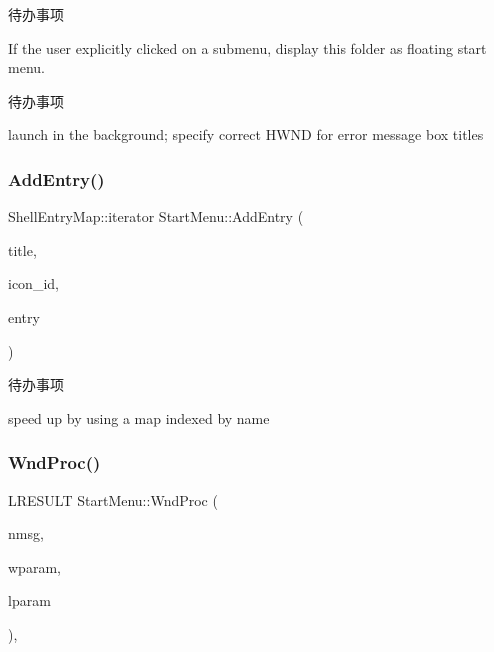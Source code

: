 \begin{DoxyRefDesc}{待办事项}
\item[\hyperlink{todo__todo000064}{待办事项}]If the user explicitly clicked on a submenu, display this folder as floating start menu. \end{DoxyRefDesc}


\begin{DoxyRefDesc}{待办事项}
\item[\hyperlink{todo__todo000065}{待办事项}]launch in the background; specify correct H\+W\+ND for error message box titles \end{DoxyRefDesc}
\mbox{\label{struct_start_menu_a3649f39dcdb77983e7f3e4de8bc9d1bf}} 
\subsubsection{\texorpdfstring{Add\+Entry()}{AddEntry()}}
{\footnotesize\ttfamily Shell\+Entry\+Map\+::iterator Start\+Menu\+::\+Add\+Entry (\begin{DoxyParamCaption}\item[{const String \&}]{title,  }\item[{I\+C\+O\+N\+\_\+\+ID}]{icon\+\_\+id,  }\item[{\hyperlink{struct_entry}{Entry} $\ast$}]{entry }\end{DoxyParamCaption})\hspace{0.3cm}{\ttfamily [protected]}}

\begin{DoxyRefDesc}{待办事项}
\item[\hyperlink{todo__todo000063}{待办事项}]speed up by using a map indexed by name \end{DoxyRefDesc}
\mbox{\label{struct_start_menu_a12aaba6be3ac789748b012dffac0cacd}} 
\subsubsection{\texorpdfstring{Wnd\+Proc()}{WndProc()}}
{\footnotesize\ttfamily L\+R\+E\+S\+U\+LT Start\+Menu\+::\+Wnd\+Proc (\begin{DoxyParamCaption}\item[{U\+I\+NT}]{nmsg,  }\item[{W\+P\+A\+R\+AM}]{wparam,  }\item[{L\+P\+A\+R\+AM}]{lparam }\end{DoxyParamCaption})\hspace{0.3cm}{\ttfamily [protected]}, {\ttfamily [virtual]}}

